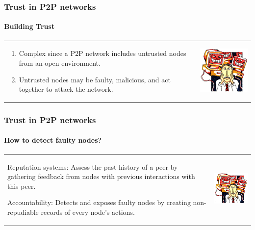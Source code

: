 \begin{frame}
\frametitle{Trust in P2P networks}
\framesubtitle{Building Trust}
\begin{table}
\begin{tabular}{p{7cm}p{3cm}}
\begin{enumerate}
    \item Complex since a P2P network includes untrusted nodes from an open environment.
    \item Untrusted nodes may be faulty, malicious, and act together to attack the network.
\end{enumerate}
&
\vspace{1.5cm}
\includegraphics[width=4cm]{img/malicious}\\
\end{tabular}
\end{table}
\end{frame}

\begin{frame}
\frametitle{Trust in P2P networks}
\framesubtitle{How to detect faulty nodes?}
\begin{table}
\begin{tabular}{p{7cm}p{3cm}}
\begin{description}
    \item{Reputation systems:} Assess the past history of a
peer by gathering feedback from nodes with previous interactions with this
peer.
    \item{Accountability:} Detects and exposes faulty nodes by
creating non-repudiable records of every node’s actions.
\end{description}
&
\vspace{1.5cm}
\includegraphics[width=4cm]{img/malicious}\\
\end{tabular}
\end{table}
\end{frame}

